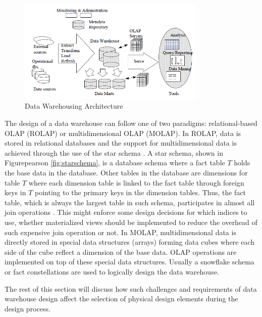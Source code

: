 \documentclass[12pt,a4paper]{article}
\begin{document}
\begin{figure}[!t]
\centering
\includegraphics[width=9cm]{figs/dw.png}
\caption{Data Warehousing Architecture \cite{chaudhuri1997overview}}
\label{fig:dw}
\end{figure}

The design of a data warehouse can follow one of two paradigms: relational-based OLAP (ROLAP) or multidimensional OLAP (MOLAP). In ROLAP, data is stored in
relational databases and the support for multidimensional data is achieved through the use of the star schema \cite{cheung2001towards}. A star schema,
shown in Figurepearson
\ref{fig:starschema}, is a database schema where a fact table $T$ holds the base data in the database. Other tables in the database are dimensions for
table $T$ where each dimension table is linked to the fact table through foreign keys in $T$ pointing to the primary keys in the dimension tables. Thus, the
fact table, which is always the largest table in such schema, participates in almost all join operations \cite{datta2002parallel}. This might enforce some
design decisions for which indices to use, whether materialized views should be implemented to reduce the overhead of such expensive join operation or not. In
MOLAP, multidimensional data is directly stored in special data structures (arrays) forming data cubes where each side of the cube reflect a dimension of the
base data. OLAP operations are implemented on top of these special data structures. Usually a snowflake schema \cite{kimball2009data} or fact constellations are
used to logically design the data warehouse.

The rest of this section will discuss how such challenges and requirements of data warehouse design affect the selection of physical design elements during the
design process.
\end{document}
